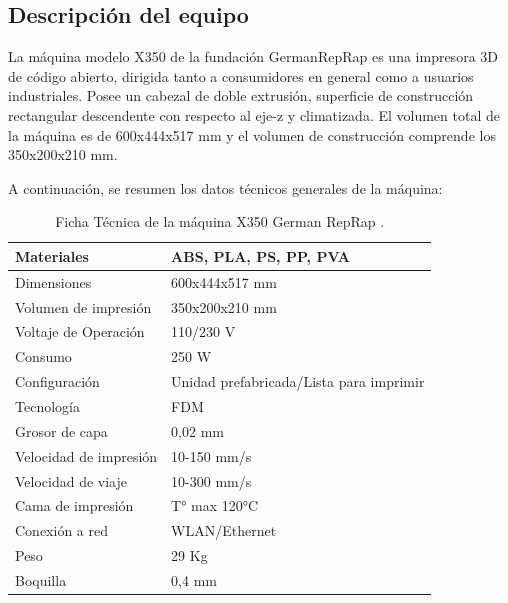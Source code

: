 \subsection{Descripción del equipo}

La máquina modelo X350 de la fundación GermanRepRap es una impresora 3D de código abierto, dirigida tanto a consumidores en general como a usuarios industriales. Posee un cabezal de doble extrusión, superficie de construcción rectangular descendente con respecto al eje-z y  climatizada. El volumen total de la máquina es de 600x444x517 mm y el volumen de construcción comprende los 350x200x210 mm.

A continuación, se resumen los datos técnicos generales de la máquina: 

\begin{table}[H]
  \centering
  
    \begin{tabular}{|l|l|}
    \hline
    Materiales & ABS, PLA, PS, PP, PVA \\
    \hline
    Dimensiones & 600x444x517 mm \\
    \hline
    Volumen de impresión & 350x200x210 mm \\
    \hline
    Voltaje de Operación & 110/230 V \\
    \hline
    Consumo & 250 W \\
    \hline
    Configuración  & Unidad prefabricada/Lista para imprimir \\
    \hline
    Tecnología & FDM \\
    \hline
    Grosor de capa & 0,02 mm \\
    \hline
    Velocidad de impresión  & 10-150 mm/s \\
    \hline
    Velocidad de viaje & 10-300 mm/s \\
    \hline
    Cama de impresión & T° max 120°C \\
    \hline
    Conexión a red & WLAN/Ethernet \\
    \hline
    Peso  & 29 Kg \\
    \hline
    Boquilla & 0,4 mm \\
    \hline
    \end{tabular}%
    \caption{Ficha Técnica de la máquina X350 German RepRap \parencite{germanreprap2019}.}
  \label{tab:addlabel}%
\end{table}%



